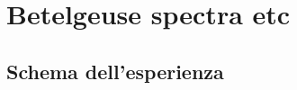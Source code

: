 \documentclass[main.tex]{subfiles}
\begin{document}

\chapter{Betelgeuse spectra etc}

\section{Schema dell'esperienza}



\end{document}
